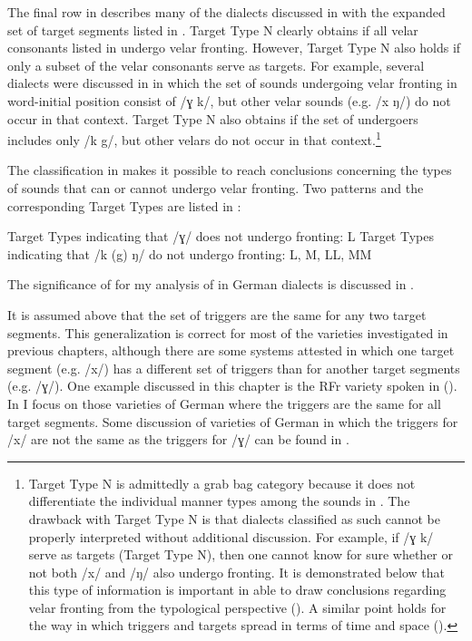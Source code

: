 The final row in  describes many of the dialects discussed in  with the expanded set of target segments listed in . Target Type N clearly obtains if all velar consonants listed in  undergo velar fronting. However, Target Type N also holds if only a subset of the velar consonants serve as targets. For example, several dialects were discussed in  in which the set of sounds undergoing velar fronting in word-initial position consist of /ɣ k/, but other velar sounds (e.g. /x ŋ/) do not occur in that context. Target Type N also obtains if the set of undergoers includes only /k g/, but other velars do not occur in that context.\footnote{{Target Type N is admittedly a grab bag category because it does not differentiate the individual manner types among the sounds in . The drawback with Target Type N is that dialects classified as such cannot be properly interpreted without additional discussion. For example, if /ɣ k/ serve as targets (Target Type N), then one cannot know for sure whether or not both /x/ and /ŋ/ also undergo fronting. It is demonstrated below that this type of information is important in able to draw conclusions regarding velar fronting from the typological perspective (). A similar point holds for the way in which triggers and targets spread in terms of time and space ().} }

The classification in  makes it possible to reach conclusions concerning the types of sounds that can or cannot undergo velar fronting. Two patterns and the corresponding Target Types are listed in :

\ea%
\label{ex:12:4}
\ea\label{ex:12:4a} Target Types indicating that /ɣ/ does not undergo fronting: L
\ex\label{ex:12:4b} Target Types indicating that /k (g) ŋ/ do not undergo fronting: L, M, LL, MM
\z 
\z 

The significance of  for my analysis of  in German dialects is discussed in .

It is assumed above that the set of triggers are the same for any two target segments. This generalization is correct for most of the varieties investigated in previous chapters, although there are some systems attested in which one target segment (e.g. /x/) has a different set of triggers than for another target segments (e.g. /ɣ/). One example discussed in this chapter is the RFr variety spoken in  (). In  I focus on those varieties of German where the triggers are the same for all target segments. Some discussion of varieties of German in which the triggers for /x/ are not the same as the triggers for /ɣ/ can be found in .

